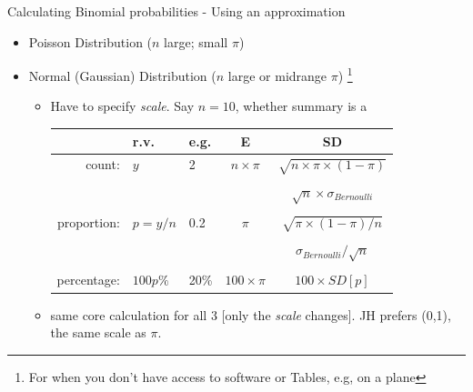 \documentclass[10pt]{beamer}\usepackage[]{graphicx}\usepackage[]{color}
\begin{document}
\begin{frame}{Calculating Binomial probabilities - Using an approximation}
	
	\small
	\begin{itemize}
		\item Poisson Distribution ($n$ large;  small $\pi$)
		\item Normal (Gaussian) Distribution ($n$ large or midrange $\pi $) \footnote{\footnotesize
			For when you don't have access to software or Tables, e.g, on a plane} 
		\begin{itemize}
			\item Have to specify \textit{scale}. Say $n=10$, whether summary is a 
			\begin{tabular}{rllcc}
				&  \textbf{r.v. }        &  \textbf{e.g.} & \textbf{E} & \textbf{SD} \\ 
				\hline
				count:          &  $y$        &  2 & $n \times \pi$ & $\sqrt{n \times \pi \times (1-\pi)}$ \\
				& & & & \\
				& & & & $\sqrt{n} \times \sigma_{Bernoulli}$ \\
				
				& & & & \\
				proportion:   & $p=y/n$  & 0.2 & $ \pi$ & $ \sqrt{\pi \times (1-\pi) / n}$ \\
				& & & & \\
				
				& & & &  $\sigma_{Bernoulli} / \sqrt{n}$\\
				
				& & & & \\
				percentage: &$100p\%$ & 20\% & $100 \times \pi$ & $100 \times SD[p]$ \\
				\hline
			\end{tabular}
			\item same core calculation for all 3 [only the \textit{scale} changes]. JH prefers (0,1), the same scale as $\pi.$
			
		\end{itemize}
		
	\end{itemize}
	
\end{frame}
\end{document}
